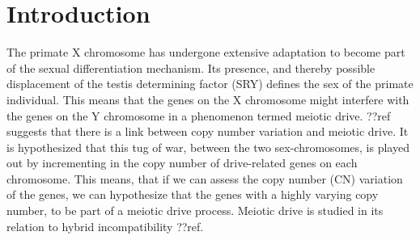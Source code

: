 \section*{Introduction}



The primate X chromosome has undergone extensive adaptation to become part of the sexual differentiation mechanism. Its presence, and thereby possible displacement of the testis determining factor (SRY) defines the sex of the primate individual. This means that the genes on the X chromosome might interfere with the genes on the Y chromosome in a phenomenon termed meiotic drive. ??ref suggests that there is a link between copy number variation and meiotic drive. It is hypothesized that this tug of war, between the two sex-chromosomes, is played out by incrementing in the copy number of drive-related genes on each chromosome. This means, that if we can assess the copy number (CN) variation of the genes, we can hypothesize that the genes with a highly varying copy number, to be part of a meiotic drive process. Meiotic drive is studied in its relation to hybrid incompatibility ??ref.
